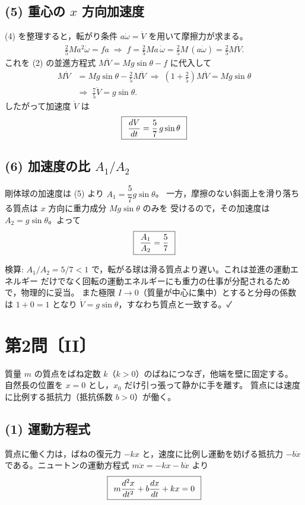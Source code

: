 \documentclass[11pt,a4paper]{article}
\begin{document}
\subsection*{(5) 重心の $x$ 方向加速度}
(4) を整理すると，転がり条件 $a\dot\omega=\dot V$ を用いて摩擦力が求まる。
\begin{align*}
  \frac{2}{5}Ma^2\dot\omega = fa
  \;\Longrightarrow\;
  f = \frac{2}{5}Ma\,\dot\omega = \frac{2}{5}M\,(a\dot\omega) = \frac{2}{5}M\dot V.
\end{align*}
これを (2) の並進方程式 $M\dot V = Mg\sin\theta - f$ に代入して
\begin{align*}
  M\dot V &= Mg\sin\theta - \frac{2}{5}M\dot V
  \;\Longrightarrow\;
  \left(1+\frac{2}{5}\right)M\dot V = Mg\sin\theta\\
  &\Longrightarrow\;
  \frac{7}{5}\dot V = g\sin\theta.
\end{align*}
したがって加速度 $\dot V$ は
\[
  \boxed{\,\;\dfrac{dV}{dt} = \dfrac{5}{7}\,g\sin\theta\;\,}
\]

\subsection*{(6) 加速度の比 $A_1/A_2$}
剛体球の加速度は (5) より $A_1=\dfrac{5}{7}g\sin\theta$。
一方，摩擦のない斜面上を滑り落ちる質点は $x$ 方向に重力成分 $Mg\sin\theta$ のみを
受けるので，その加速度は $A_2=g\sin\theta$。よって
\[
  \boxed{\,\;\dfrac{A_1}{A_2} = \dfrac{5}{7}\;\,}
\]

\medskip
検算: $A_1/A_2=5/7<1$ で，転がる球は滑る質点より遅い。これは並進の運動エネルギー
だけでなく回転の運動エネルギーにも重力の仕事が分配されるためで，物理的に妥当。
また極限 $I\to0$（質量が中心に集中）とすると分母の係数は $1+0=1$ となり
$\dot V=g\sin\theta$，すなわち質点と一致する。✓

\clearpage
\section*{第2問〔II〕}

質量 $m$ の質点をばね定数 $k$（$k>0$）のばねにつなぎ，他端を壁に固定する。
自然長の位置を $x=0$ とし，$x_0$ だけ引っ張って静かに手を離す。
質点には速度に比例する抵抗力（抵抗係数 $b>0$）が働く。

\subsection*{(1) 運動方程式}
質点に働く力は，ばねの復元力 $-kx$ と，速度に比例し運動を妨げる抵抗力 $-b\dot x$
である。ニュートンの運動方程式 $m\ddot x = -kx - b\dot x$ より
\[
  \boxed{\,\;m\dfrac{d^2x}{dt^2} + b\dfrac{dx}{dt} + kx = 0\;\,}
\]
\end{document}
